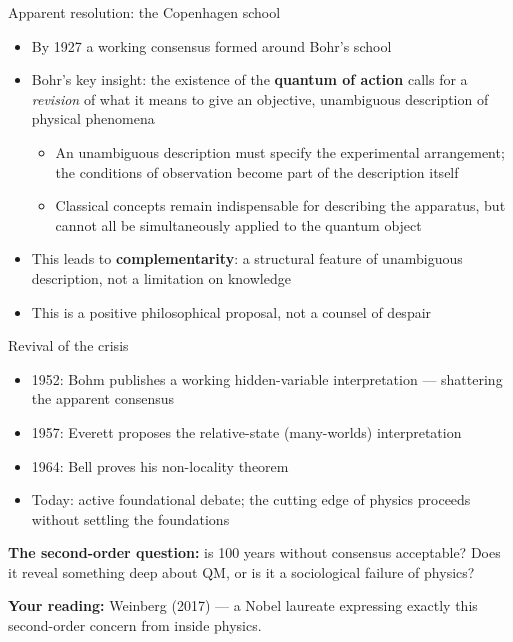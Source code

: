 \documentclass[fleql]{beamer}
\newcommand{\kw}[1]{\textbf{#1}}
\begin{document}
\begin{frame}{Apparent resolution: the Copenhagen school}

  \begin{itemize}
  \item By 1927 a working consensus formed around Bohr's school
  \item Bohr's key insight: the existence of the \kw{quantum of
    action} calls for a \emph{revision} of what it means to give an
    objective, unambiguous description of physical phenomena
    \begin{itemize}
    \item An unambiguous description must specify the experimental
      arrangement; the conditions of observation become part of
      the description itself
    \item Classical concepts remain indispensable for describing
      the apparatus, but cannot all be simultaneously applied to
      the quantum object
    \end{itemize}
  \item This leads to \kw{complementarity}: a structural feature of
    unambiguous description, not a limitation on knowledge
  \item This is a positive philosophical proposal, not a
    counsel of despair
  \end{itemize}

\end{frame}

\begin{frame}{Revival of the crisis}

  \begin{itemize}
  \item 1952: Bohm publishes a working hidden-variable
    interpretation --- shattering the apparent consensus
  \item 1957: Everett proposes the relative-state (many-worlds)
    interpretation
  \item 1964: Bell proves his non-locality theorem
  \item Today: active foundational debate; the cutting edge of
    physics proceeds without settling the foundations
  \end{itemize}

  \vspace{0.5em}
  \textbf{The second-order question:} is 100 years without consensus
  acceptable? Does it reveal something deep about QM, or is it a
  sociological failure of physics?

  \vspace{0.4em}
  \small \textbf{Your reading:} Weinberg (2017) --- a Nobel
  laureate expressing exactly this second-order concern from
  inside physics.

\end{frame}
\end{document}
